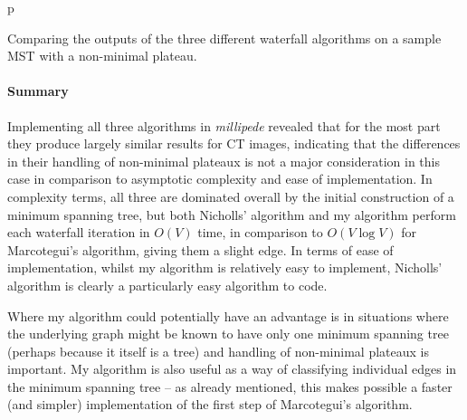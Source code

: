\begin{stusubfig}{p}
	\hspace{4mm}%
\caption{Comparing the outputs of the three different waterfall algorithms on a sample MST with a non-minimal plateau.}
\label{fig:segmentation-waterfall-comparison}
\end{stusubfig}

\paragraph{Summary}

Implementing all three algorithms in \emph{millipede} revealed that for the most part they produce largely similar results for CT images, indicating that the differences in their handling of non-minimal plateaux is not a major consideration in this case in comparison to asymptotic complexity and ease of implementation. In complexity terms, all three are dominated overall by the initial construction of a minimum spanning tree, but both Nicholls' algorithm and my algorithm perform each waterfall iteration in $O(V)$ time, in comparison to $O(V \log V)$ for Marcotegui's algorithm, giving them a slight edge. In terms of ease of implementation, whilst my algorithm is relatively easy to implement, Nicholls' algorithm is clearly a particularly easy algorithm to code.

Where my algorithm could potentially have an advantage is in situations where the underlying graph might be known to have only one minimum spanning tree (perhaps because it itself is a tree) and handling of non-minimal plateaux is important. My algorithm is also useful as a way of classifying individual edges in the minimum spanning tree -- as already mentioned, this makes possible a faster (and simpler) implementation of the first step of Marcotegui's algorithm.

